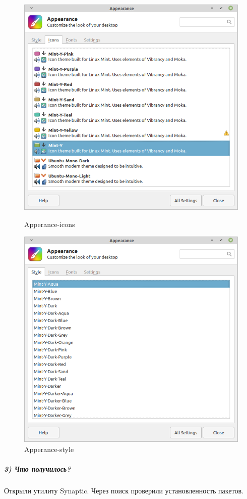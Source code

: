 \begin{figure}[!htp]
    \begin{minipage}{0.49\textwidth}
        \centering
        \includegraphics[width=\linewidth]
            {input/task-2/3/Apperance-icons.png}
        \caption{Apperance-icons}
        \label{fig:Apperance-icons}
    \end{minipage}
    \begin{minipage}{0.49\textwidth}
        \centering
        \includegraphics[width=\linewidth]
            {input/task-2/3/Apperance-style.png}
        \caption{Apperance-style}
        \label{fig:Apperance-style}
    \end{minipage}
\end{figure}

\subparagraph{3) Что получилось?}

Открыли утилиту Synaptic. Через поиск проверили установленность пакетов.
